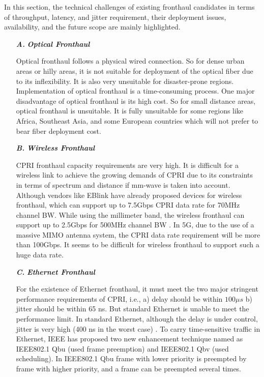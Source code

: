 \begin{multicols}{2}
In this section, the technical challenges of existing fronthaul candidates in terms of throughput, latency, and jitter requirement, their deployment issues, availability, and the future scope are mainly highlighted.

\begin{itemize}

\item[{\textit{\textbf{ A.}}}] {\textit{\textbf{Optical Fronthaul}}}

Optical fronthaul follows a physical wired connection. So for dense urban areas or hilly areas, it is not suitable for deployment of the optical fiber due to its inflexibility. It is also very unsuitable for disaster-prone regions. Implementation of optical fronthaul is a time-consuming process. One major disadvantage of optical fronthaul is its high cost. So for small distance areas, optical fronthaul is unsuitable. It is fully unsuitable for some regions like Africa, Southeast Asia, and some European countries which will not prefer to bear fiber deployment cost.

\item[{\textit{\textbf{ B.}}}] {\textit{\textbf{Wireless Fronthaul}}}

CPRI fronthaul capacity requirements are very high. It is difficult for a wireless link to achieve the growing demands of CPRI due to its constraints in terms of spectrum and distance if mm-wave is taken into account. Although vendors like EBlink have already proposed devices for wireless fronthaul, which can support up to 7.5Gbps CPRI data rate for 70MHz channel BW. While using the millimeter band, the wireless fronthaul can support up to 2.5Gbps for 500MHz channel BW \cite{art3-key43}. In 5G, due to the use of a massive MIMO antenna system, the CPRI data rate requirement will be more than 100Gbps. It seems to be difficult for wireless fronthaul to support such a huge data rate.

\item[{\textit{\textbf{ C.}}}] {\textit{\textbf{Ethernet Fronthaul}}}

For the existence of Ethernet fronthaul, it must meet the two major stringent performance requirements of CPRI, i.e., a) delay should be within $100 \mu s$ b) jitter should be within 65 ns. But standard Ethernet is unable to meet the performance limit. In standard Ethernet, although the delay is under control, jitter is very high (400 ns in the worst case) \cite{art3-key49}. To carry time-sensitive traffic in Ethernet, IEEE has proposed two new enhancement technique named as IEEE802.1 Qbu (used frame preemption) and IEEE802.1 Qbv (used scheduling). In IEEE802.1 Qbu frame with lower priority is preempted by frame with higher priority, and a frame can be preempted several times.


\end{itemize}
\end{multicols}
